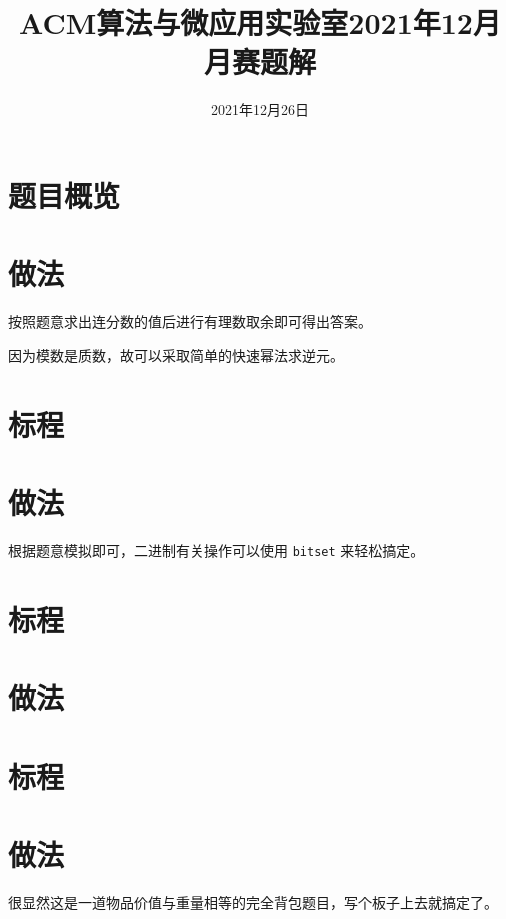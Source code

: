 \documentclass{ctsol}
\title{ACM算法与微应用实验室2021年12月月赛题解}
\date{2021年12月26日}
\begin{document}
\maketitle
{}

\section*{题目概览}
\solutiontab

\makesolution
\section*{做法}
按照题意求出连分数的值后进行有理数取余即可得出答案。

因为模数是质数，故可以采取简单的快速幂法求逆元。

\section*{标程}

\makesolution
\section*{做法}

根据题意模拟即可，二进制有关操作可以使用 \verb|bitset| 来轻松搞定。

\section*{标程}

\makesolution
\section*{做法}

\section*{标程}

\makesolution
\section*{做法}

很显然这是一道物品价值与重量相等的完全背包题目，写个板子上去就搞定了。
\end{document}
